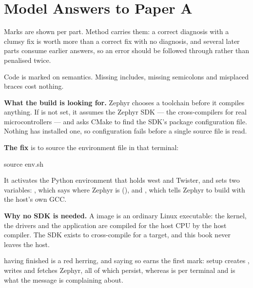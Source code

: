 
\renewcommand{\answerprefix}{ansa}

\chapter{Model Answers to Paper A}
\label{ansa:ch:answers}

Marks are shown per part. Method carries them: a correct diagnosis with a clumsy fix is worth more
than a correct fix with no diagnosis, and several later parts consume earlier answers, so an error
should be followed through rather than penalised twice.

Code is marked on semantics. Missing includes, missing semicolons and misplaced braces cost nothing.


\textbf{What the build is looking for.} Zephyr chooses a toolchain before it compiles anything. If
 is not set, it assumes the Zephyr SDK --- the cross-compilers for
real microcontrollers --- and asks CMake to find the SDK's package configuration file. Nothing has
installed one, so configuration fails before a single source file is read. 

\textbf{The fix} is to source the environment file in that terminal:

\begin{shell}
source env.sh
\end{shell}

\noindent It activates the Python environment that holds west and Twister, and sets two variables:
, which says where Zephyr is (), and
, which tells Zephyr to build with the host's own GCC.

\textbf{Why no SDK is needed.} A  image is an ordinary Linux executable: the
kernel, the drivers and the application are compiled for the host CPU by the host compiler. The SDK
exists to cross-compile for a target, and this book never leaves the host. 

 having finished is a red herring, and saying so earns the first mark: setup
creates , writes  and fetches Zephyr, all of which persist, whereas
 is per terminal and is what the message is complaining about.

